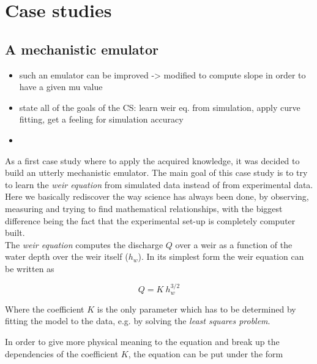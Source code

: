 \chapter{Case studies}
\label{chp:case_studies}


\section{A mechanistic emulator}

\begin{itemize}
\itemsep0em
  \item such an emulator can be improved -> modified to compute slope in order to have a given mu value
  \item state all of the goals of the CS: learn weir eq. from simulation, apply curve fitting, get a feeling for simulation accuracy
  \item 
\end{itemize}

As a first case study where to apply the acquired knowledge, it was decided to build an utterly mechanistic emulator.
The main goal of this case study is to try to learn the \emph{weir equation} from simulated data instead of from experimental data.
Here we basically rediscover the way science has always been done, by observing, measuring and trying to find mathematical relationships, with the biggest difference being the fact that the experimental set-up is completely computer built.\\

The \emph{weir equation} computes the discharge $Q$ over a weir as a function of the water depth over the weir itself ($h_w$).
In its simplest form the weir equation can be written as

\begin{equation}
  Q = K\: h_w^{3/2}
\end{equation}

\noindent Where the coefficient $K$ is the only parameter which has to be determined by fitting the model to the data, e.g. by solving the \emph{least squares problem}.

In order to give more physical meaning to the equation and break up the dependencies of the coefficient $K$, the equation can be put under the form

